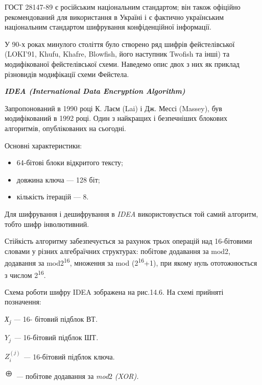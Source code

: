 \bigskip


\bigskip

ГОСТ 28147-89 є російським національним стандартом; він також офіційно
рекомендований для використання в Україні і є фактично українським національним
стандартом шифрування конфіденційної інформації.


\bigskip

У 90-х роках минулого століття було створено ряд шифрів фейстелівської (LOKI’91,
Khufu, Khafre, Blowfish, його наступник Twofish та інші) та модифікованої
фейстелівської схеми.  Наведемо опис двох з них як приклад різновидів
модифікації схеми Фейстела.\textbf{\textit{ }}


\bigskip


\bigskip

{\centering\bfseries\itshape
IDEA (International Data Encryption Algorithm)
\par}


\bigskip

Запропонований в 1990 році К. Лаєм (Lai) і Дж. Мессі (Massey), був модифікований
в 1992 році. Один з найкращих і безпечніших блокових алгоритмів, опублікованих
на сьогодні.

Основні характеристики:

\liststyleWWviiiNumxlvi
\begin{itemize}
\item 64-бітові блоки відкритого тексту;
\item довжина ключа --- 128 біт;
\item кількість ітерацій --- 8.
\end{itemize}
Для шифрування і дешифрування в \textit{IDEA} використовується той самий
алгоритм, тобто шифр інволютивний.

Стійкість алгоритму забезпечується за рахунок трьох операцій над 16-бітовими
словами у різних алгебраїчних структурах: побітове додавання за mod2, додавання
за mod2\textsuperscript{16}, множення за mod (2\textsuperscript{16}+1), при
якому нуль ототожнюється з числом 2\textsuperscript{16}.

Схема роботи шифру IDEA зображена на рис.14.6. На схемі прийняті позначення:

\textit{Х}\textit{\textsubscript{j}}\textit{ ---} 16- бітовий підблок ВТ\textit{.}

 $Y_j$\textit{ --- }16-бітовий підблок ШТ\textit{.}

 $Z_i^{(j)}$\textit{ --- }16-бітовий підблок ключа.

 \includegraphics[width=0.1807in,height=0.1937in]{crypt-img/crypt-img299.png}
\textit{ ---} побітове додавання за\textit{ }\textit{mod}2\textit{
(}\textit{XOR}\textit{).}

